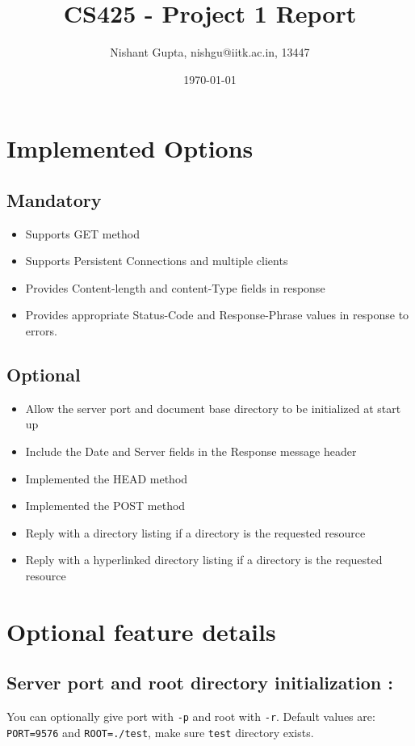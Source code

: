 \documentclass[11pt]{article}
\author{Nishant Gupta, nishgu@iitk.ac.in, 13447}
\date{\today}
\title{CS425 - Project 1 Report}
\begin{document}
\maketitle



\section{Implemented Options}
\label{sec:orgheadline3}
\subsection{Mandatory}
\label{sec:orgheadline1}
\begin{itemize}
\item Supports GET method
\item Supports Persistent Connections and multiple clients
\item Provides Content-length and content-Type fields in response
\item Provides appropriate Status-Code and Response-Phrase values in response to errors.
\end{itemize}
\subsection{Optional}
\label{sec:orgheadline2}
\begin{itemize}
\item Allow the server port and document base directory to be initialized at start up
\item Include the Date and Server fields in the Response message header
\item Implemented the HEAD method
\item Implemented the POST method
\item Reply with a directory listing if a directory is the requested resource
\item Reply with a hyperlinked directory listing if a directory is the requested resource
\end{itemize}

\newpage
\section{Optional feature details}
\label{sec:orgheadline8}
\subsection{Server port and root directory initialization :}
\label{sec:orgheadline4}
You can optionally give port with \texttt{-p} and root with \texttt{-r}. Default values are: \texttt{PORT=9576} and \texttt{ROOT=./test}, make sure \texttt{test} directory exists. 
\end{document}
